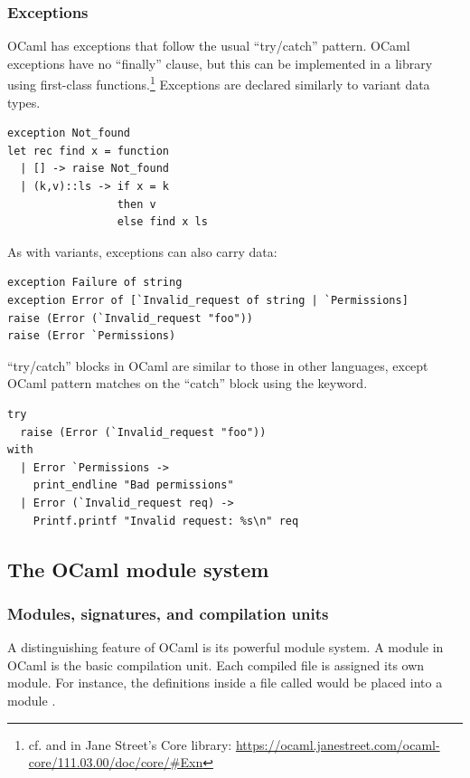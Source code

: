 \subsubsection{Exceptions}

OCaml has exceptions that follow the usual ``try/catch''
pattern. OCaml exceptions have no ``finally'' clause, but this can be
implemented in a library using first-class
functions.\footnote{cf.  and  in Jane
  Street's Core library:
  \url{https://ocaml.janestreet.com/ocaml-core/111.03.00/doc/core/#Exn}}
Exceptions are declared similarly to variant data types.

\begin{lstlisting}
exception Not_found
let rec find x = function
  | [] -> raise Not_found
  | (k,v)::ls -> if x = k
                 then v
                 else find x ls
\end{lstlisting}

As with variants, exceptions can also carry data:

\begin{lstlisting}
exception Failure of string
exception Error of [`Invalid_request of string | `Permissions]
raise (Error (`Invalid_request "foo"))
raise (Error `Permissions)
\end{lstlisting}

``try/catch'' blocks in OCaml are similar to those in other languages,
except OCaml pattern matches on the ``catch'' block using the
 keyword.

\begin{lstlisting}
try
  raise (Error (`Invalid_request "foo"))
with
  | Error `Permissions ->
    print_endline "Bad permissions"
  | Error (`Invalid_request req) ->
    Printf.printf "Invalid request: %s\n" req
\end{lstlisting}

\subsection{The OCaml module system}

\subsubsection{Modules, signatures, and compilation units}

A distinguishing feature of OCaml is its powerful module system. A
module in OCaml is the basic compilation unit. Each compiled file is
assigned its own module. For instance, the definitions inside a file
called  would be placed into a module .

